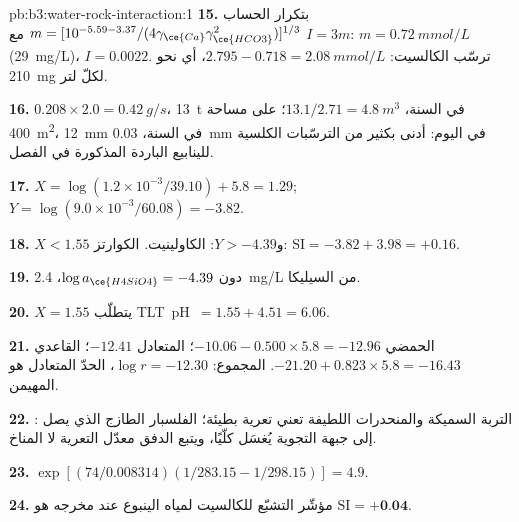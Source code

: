 \begin{solution}{pb:b3:water-rock-interaction:1}
\textbf{15.} بتكرار الحساب $m = [10^{-5.59 - 3.37}/(4\gamma_{\ce{Ca}}
\gamma_{\ce{HCO3}}^2)]^{1/3}$ مع $I = 3m$: $m = \qty{0.72}{mmol/L}$
(\qty{29}{mg/L})، $I = 0.0022$. ترسّب الكالسيت: $2.795 - 0.718 =
\qty{2.08}{mmol/L}$، أي نحو \qty{210}{mg} لكلّ لتر.

\textbf{16.} $0.208\times2.0 = \qty{0.42}{g/s}$، \qty{13}{t} في السنة،
$13.1/2.71 = \qty{4.8}{m^3}$؛ على مساحة \qty{400}{m^2}، \qty{12}{mm} في السنة،
\qty{0.03}{mm} في اليوم: أدنى بكثير من الترسّبات الكلسية للينابيع الباردة المذكورة في الفصل.

\textbf{17.} $X = \log(1.2\times10^{-3}/39.10) + 5.8 = 1.29$; $Y =
\log(9.0\times10^{-3}/60.08) = -3.82$.

\textbf{18.} $X < 1.55$ و$Y > -4.39$: الكاولينيت. الكوارتز: $\mathrm{SI} =
-3.82 + 3.98 = +0.16$.

\textbf{19.} دون $\log a_{\ce{H4SiO4}} = -4.39$، \qty{2.4}{mg/L} من
السيليكا.

\textbf{20.} $X = 1.55$ يتطلّب \mbox{\textdir TLT pH $= 1.55 + 4.51 = 6.06$}.

\textbf{21.} الحمضي $-10.06 - 0.500\times5.8 = -12.96$؛ المتعادل $-12.41$؛ القاعدي
$-21.20 + 0.823\times5.8 = -16.43$. المجموع: $\log r = -12.30$، الحدّ المتعادل
هو المهيمن.

\textbf{22.} : التربة السميكة والمنحدرات اللطيفة تعني تعرية بطيئة؛
الفلسبار الطازج الذي يصل إلى جبهة التجوية يُغسَل كلّيًا،
ويتبع الدفق معدّل التعرية لا المناخ.

\textbf{23.} $\exp[(74/0.008314)(1/283.15 - 1/298.15)] = 4.9$.

\textbf{24.} مؤشّر التشبّع للكالسيت لمياه الينبوع عند مخرجه
هو $\mathrm{SI} = \textbf{+0.04}$.
\end{solution}
